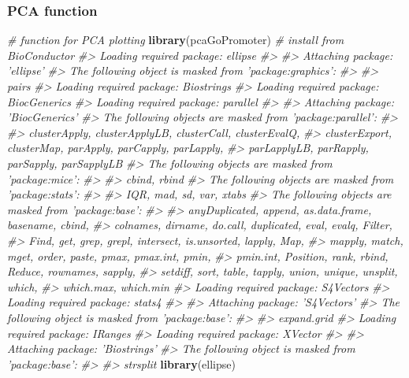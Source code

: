 \documentclass[]{book}
\newenvironment{Shaded}{\begin{snugshade}}{\end{snugshade}}
\newcommand{\CommentTok}[1]{\textcolor[rgb]{0.56,0.35,0.01}{\textit{#1}}}
\newcommand{\KeywordTok}[1]{\textcolor[rgb]{0.13,0.29,0.53}{\textbf{#1}}}
\newcommand{\NormalTok}[1]{#1}
\begin{document}
\hypertarget{pca-function}{%
\subsubsection{PCA function}\label{pca-function}}

\begin{Shaded}
\begin{Highlighting}[]
\CommentTok{# function for PCA plotting}
\KeywordTok{library}\NormalTok{(pcaGoPromoter)                  }\CommentTok{# install from BioConductor}
\CommentTok{#> Loading required package: ellipse}
\CommentTok{#> }
\CommentTok{#> Attaching package: 'ellipse'}
\CommentTok{#> The following object is masked from 'package:graphics':}
\CommentTok{#> }
\CommentTok{#>     pairs}
\CommentTok{#> Loading required package: Biostrings}
\CommentTok{#> Loading required package: BiocGenerics}
\CommentTok{#> Loading required package: parallel}
\CommentTok{#> }
\CommentTok{#> Attaching package: 'BiocGenerics'}
\CommentTok{#> The following objects are masked from 'package:parallel':}
\CommentTok{#> }
\CommentTok{#>     clusterApply, clusterApplyLB, clusterCall, clusterEvalQ,}
\CommentTok{#>     clusterExport, clusterMap, parApply, parCapply, parLapply,}
\CommentTok{#>     parLapplyLB, parRapply, parSapply, parSapplyLB}
\CommentTok{#> The following objects are masked from 'package:mice':}
\CommentTok{#> }
\CommentTok{#>     cbind, rbind}
\CommentTok{#> The following objects are masked from 'package:stats':}
\CommentTok{#> }
\CommentTok{#>     IQR, mad, sd, var, xtabs}
\CommentTok{#> The following objects are masked from 'package:base':}
\CommentTok{#> }
\CommentTok{#>     anyDuplicated, append, as.data.frame, basename, cbind,}
\CommentTok{#>     colnames, dirname, do.call, duplicated, eval, evalq, Filter,}
\CommentTok{#>     Find, get, grep, grepl, intersect, is.unsorted, lapply, Map,}
\CommentTok{#>     mapply, match, mget, order, paste, pmax, pmax.int, pmin,}
\CommentTok{#>     pmin.int, Position, rank, rbind, Reduce, rownames, sapply,}
\CommentTok{#>     setdiff, sort, table, tapply, union, unique, unsplit, which,}
\CommentTok{#>     which.max, which.min}
\CommentTok{#> Loading required package: S4Vectors}
\CommentTok{#> Loading required package: stats4}
\CommentTok{#> }
\CommentTok{#> Attaching package: 'S4Vectors'}
\CommentTok{#> The following object is masked from 'package:base':}
\CommentTok{#> }
\CommentTok{#>     expand.grid}
\CommentTok{#> Loading required package: IRanges}
\CommentTok{#> Loading required package: XVector}
\CommentTok{#> }
\CommentTok{#> Attaching package: 'Biostrings'}
\CommentTok{#> The following object is masked from 'package:base':}
\CommentTok{#> }
\CommentTok{#>     strsplit}
\KeywordTok{library}\NormalTok{(ellipse)}


\end{Highlighting}
\end{Shaded}
\end{document}
